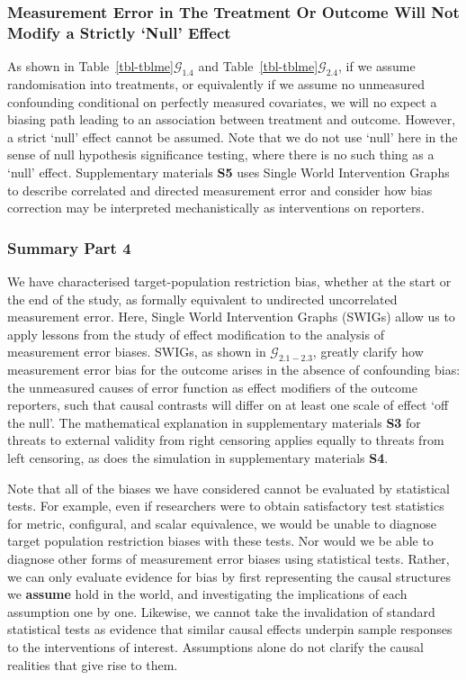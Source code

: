 \documentclass[
  single column]{article}
\begin{document}
\subsubsection{Measurement Error in The Treatment Or Outcome Will Not
Modify a Strictly `Null'
Effect}\label{measurement-error-in-the-treatment-or-outcome-will-not-modify-a-strictly-null-effect}

As shown in Table~\ref{tbl-tblme}\(\mathcal{G}_{1.4}\) and
Table~\ref{tbl-tblme}\(\mathcal{G}_{2.4}\), if we assume randomisation
into treatments, or equivalently if we assume no unmeasured confounding
conditional on perfectly measured covariates, we will no expect a
biasing path leading to an association between treatment and outcome.
However, a strict `null' effect cannot be assumed. Note that we do not
use `null' here in the sense of null hypothesis significance testing,
where there is no such thing as a `null' effect. Supplementary materials
\textbf{S5} uses Single World Intervention Graphs to describe correlated
and directed measurement error and consider how bias correction may be
interpreted mechanistically as interventions on reporters.

\subsubsection{Summary Part 4}\label{summary-part-4}

We have characterised target-population restriction bias, whether at the
start or the end of the study, as formally equivalent to undirected
uncorrelated measurement error. Here, Single World Intervention Graphs
(SWIGs) allow us to apply lessons from the study of effect modification
to the analysis of measurement error biases. SWIGs, as shown in
\(\mathcal{G}_{2.1-2.3}\), greatly clarify how measurement error bias
for the outcome arises in the absence of confounding bias: the
unmeasured causes of error function as effect modifiers of the outcome
reporters, such that causal contrasts will differ on at least one scale
of effect `off the null'. The mathematical explanation in supplementary
materials \textbf{S3} for threats to external validity from right
censoring applies equally to threats from left censoring, as does the
simulation in supplementary materials \textbf{S4}.

Note that all of the biases we have considered cannot be evaluated by
statistical tests. For example, even if researchers were to obtain
satisfactory test statistics for metric, configural, and scalar
equivalence, we would be unable to diagnose target population
restriction biases with these tests. Nor would we be able to diagnose
other forms of measurement error biases using statistical tests. Rather,
we can only evaluate evidence for bias by first representing the causal
structures we \textbf{assume} hold in the world, and investigating the
implications of each assumption one by one. Likewise, we cannot take the
invalidation of standard statistical tests as evidence that similar
causal effects underpin sample responses to the interventions of
interest. Assumptions alone do not clarify the causal realities that
give rise to them.
\end{document}
